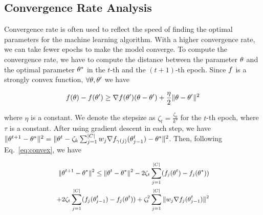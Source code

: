 \subsection{Convergence Rate Analysis}
\label{sec:proof}

Convergence rate is often used to reflect the speed of finding the optimal parameters for the machine learning algorithm. With a higher convergence rate, we can take fewer epochs to make the model converge. To compute the convergence rate, we have  to compute the distance between the parameter $\theta$ and the optimal parameter $\theta^*$ in the $t$-th and the $(t+1)$-th epoch. Since $f$ is a strongly convex function, $\forall \theta, \theta^{\prime}$ we have

\vspace{-0.5em}
\begin{equation}
	\label{eq:convex}
	\small
	f(\theta) - f(\theta^{\prime}) \ge  \nabla f(\theta^{\prime}) (\theta - \theta^{\prime}) + \frac{\eta}{2} \Vert \theta - \theta^{\prime} \Vert^{2}
\end{equation}


\noindent where $\eta$ is a constant.  We denote the stepsize as $\zeta_t = \frac{\zeta_0}{k^\tau}$ for the $t$-th epoch, where $\tau$ is a constant.
After using gradient descent in each step, we have $\Vert \theta^{t+1} - \theta^{*} \Vert^{2} 
= \Vert \theta^{t} - \zeta_{k} \sum_{j=1}^{\vert C \vert} w_j \nabla f_{\gamma(j)} (\theta_{j-1}^t) - \theta^{*} \Vert^{2}$. Then, following Eq.~\ref{eq:convex}, we have 

\vspace{-1em}
\begin{equation}
	\label{eq:afterig}
	\small
	\begin{aligned}
		\Vert \theta^{t+1} - \theta^{*} \Vert^{2} 
		\le  \Vert \theta^{t} - \theta^{*} \Vert^{2} - 2 \zeta_{t} \sum_{j=1}^{\vert C \vert} (f_{j}(\theta^{t}) - f_{j}(\theta^{*}))  \\
		+ 2 \zeta_{t} \sum_{j=1}^{\vert C \vert} (f_{j}(\theta_{j-1}^{t}) 
		- f_{j}(\theta^{t})) + \zeta_{t}^{2} \sum_{j=1}^{\vert C \vert} \Vert w_{j} \nabla f_j (\theta_{j-1}^t) \Vert^{2}
	\end{aligned}
\end{equation}



